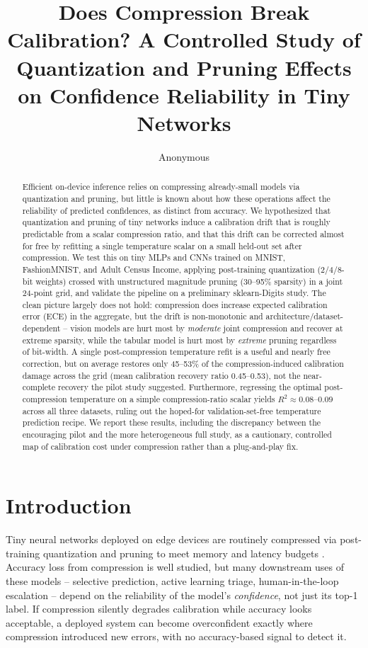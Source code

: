 \documentclass{article} %
\title{
Does Compression Break Calibration? A Controlled Study of Quantization and Pruning Effects on Confidence Reliability in Tiny Networks
}
\author{Anonymous}
\theoremstyle{plain}
\theoremstyle{definition}
\theoremstyle{remark}
\begin{document}
\maketitle

\begin{abstract}
Efficient on-device inference relies on compressing already-small models via quantization and pruning, but little is known about how these operations affect the reliability of predicted confidences, as distinct from accuracy. We hypothesized that quantization and pruning of tiny networks induce a calibration drift that is roughly predictable from a scalar compression ratio, and that this drift can be corrected almost for free by refitting a single temperature scalar on a small held-out set after compression. We test this on tiny MLPs and CNNs trained on MNIST, FashionMNIST, and Adult Census Income, applying post-training quantization (2/4/8-bit weights) crossed with unstructured magnitude pruning (30--95\% sparsity) in a joint 24-point grid, and validate the pipeline on a preliminary sklearn-Digits study. The clean picture largely does not hold: compression does increase expected calibration error (ECE) in the aggregate, but the drift is non-monotonic and architecture/dataset-dependent -- vision models are hurt most by \emph{moderate} joint compression and recover at extreme sparsity, while the tabular model is hurt most by \emph{extreme} pruning regardless of bit-width. A single post-compression temperature refit is a useful and nearly free correction, but on average restores only 45--53\% of the compression-induced calibration damage across the grid (mean calibration recovery ratio 0.45--0.53), not the near-complete recovery the pilot study suggested. Furthermore, regressing the optimal post-compression temperature on a simple compression-ratio scalar yields $R^2 \approx 0.08$--$0.09$ across all three datasets, ruling out the hoped-for validation-set-free temperature prediction recipe. We report these results, including the discrepancy between the encouraging pilot and the more heterogeneous full study, as a cautionary, controlled map of calibration cost under compression rather than a plug-and-play fix.
\end{abstract}

\section{Introduction}
\label{sec:intro}
Tiny neural networks deployed on edge devices are routinely compressed via post-training quantization and pruning to meet memory and latency budgets \citep{jacob2017quantizationat,han2015deepcc}. Accuracy loss from compression is well studied, but many downstream uses of these models -- selective prediction, active learning triage, human-in-the-loop escalation -- depend on the reliability of the model's \emph{confidence}, not just its top-1 label. If compression silently degrades calibration while accuracy looks acceptable, a deployed system can become overconfident exactly where compression introduced new errors, with no accuracy-based signal to detect it.
\end{document}
